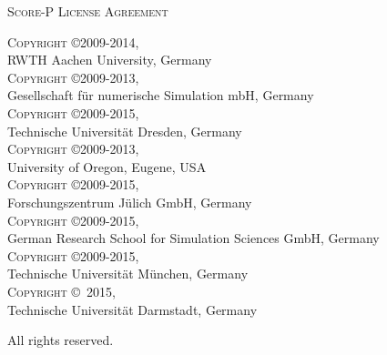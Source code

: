 \begin{center}
  \textsc{\LARGE Score-P License Agreement}
\end{center}

\textsc{Copyright \copyright 2009-2014,} \\
\hspace*{10mm}RWTH Aachen University, Germany \\
\textsc{Copyright \copyright 2009-2013,} \\
\hspace*{10mm}Gesellschaft f{\"u}r numerische Simulation mbH, Germany \\
\textsc{Copyright \copyright 2009-2015,} \\
\hspace*{10mm}Technische Universit{\"a}t Dresden, Germany \\
\textsc{Copyright \copyright 2009-2013,} \\
\hspace*{10mm}University of Oregon, Eugene, USA \\
\textsc{Copyright \copyright 2009-2015,} \\
\hspace*{10mm}Forschungszentrum J{\"u}lich GmbH, Germany \\
\textsc{Copyright \copyright 2009-2015,} \\
\hspace*{10mm}German Research School for Simulation Sciences GmbH, Germany \\
\textsc{Copyright \copyright 2009-2015,} \\
\hspace*{10mm}Technische Universit{\"a}t M{\"u}nchen, Germany \\
\textsc{Copyright \copyright\, 2015,} \\
\hspace*{10mm}Technische Universit{\"a}t Darmstadt, Germany

All rights reserved.
\vfill

